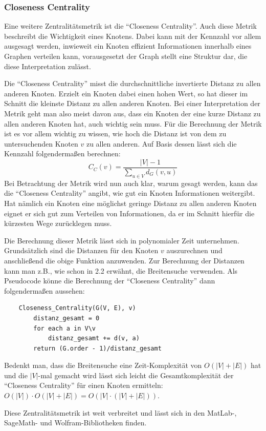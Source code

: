 \documentclass[a4paper,12pt,ngerman,chapterprefix=false,listof=totoc,bibliography=totoc]{scrreprt}
\begin{document}
\subsubsection*{Closeness Centrality}
{
Eine weitere Zentralitätsmetrik ist die "`Closeness Centrality"'. Auch diese Metrik beschreibt die Wichtigkeit eines Knotens. Dabei kann mit der Kennzahl vor allem ausgesagt werden, inwieweit ein Knoten effizient Informationen innerhalb eines Graphen verteilen kann, vorausgesetzt der Graph stellt eine Struktur dar, die diese Interpretation zulässt. \cite{neo4j_closeness_2020}

Die "`Closeness Centrality"' misst die durchschnittliche invertierte Distanz zu allen anderen Knoten. Erzielt ein Knoten dabei einen hohen Wert, so hat dieser im Schnitt die kleinste Distanz zu allen anderen Knoten. Bei einer Interpretation der Metrik geht man also meist davon aus, dass ein Knoten der eine kurze Distanz zu allen anderen Knoten hat, auch wichtig sein muss. Für die Berechnung der Metrik ist es vor allem wichtig zu wissen, wie hoch die Distanz ist von dem zu untersuchenden Knoten \(v\) zu allen anderen. Auf Basis dessen lässt sich die Kennzahl folgendermaßen berechnen: \cite{cohen_computing_2014}
\[
	C_C(v)=\frac{|V|-1}{\sum_{u\in V}d_G(v,u)}	
\]
Bei Betrachtung der Metrik wird nun auch klar, warum gesagt werden, kann das die "`Closeness Centrality"' angibt, wie gut ein Knoten Informationen weitergibt. Hat nämlich ein Knoten eine möglichst geringe Distanz zu allen anderen Knoten eignet er sich gut zum Verteilen von Informationen, da er im Schnitt hierfür die kürzesten Wege zurücklegen muss.

Die Berechnung dieser Metrik lässt sich in polynomialer Zeit unternehmen. Grundsätzlich sind die Distanzen für den Knoten \(v\) auszurechnen und anschließend die obige Funktion anzuwenden. Zur Berechnung der Distanzen kann man z.B., wie schon in 2.2 erwähnt, die Breitensuche verwenden. Als Pseudocode könne die Berechnung der "`Closeness Centrality"' dann folgendermaßen aussehen:
\begin{lstlisting}
	Closeness_Centrality(G(V, E), v)
		distanz_gesamt = 0
		for each a in V\v
			distanz_gesamt += d(v, a)
		return (G.order - 1)/distanz_gesamt
\end{lstlisting}
Bedenkt man, dass die Breitensuche eine Zeit-Komplexität von \(O(|V|+|E|)\) hat und die \(|V|\)-mal gemacht wird lässt sich leicht die Gesamtkomplexität der "`Closeness Centrality"' für einen Knoten ermitteln: \(O(|V|)\cdot O(|V|+|E|)=O(|V|\cdot(|V|+|E|))\). \cite{sariyuce_incremental_2013}

Diese Zentralitätsmetrik ist weit verbreitet und lässt sich in den MatLab-, SageMath- und Wolfram-Bibliotheken finden. \cite{matlab_measure_2020,sagemath_generic_nodate,wolfram_graph_2020}
}
\end{document}
